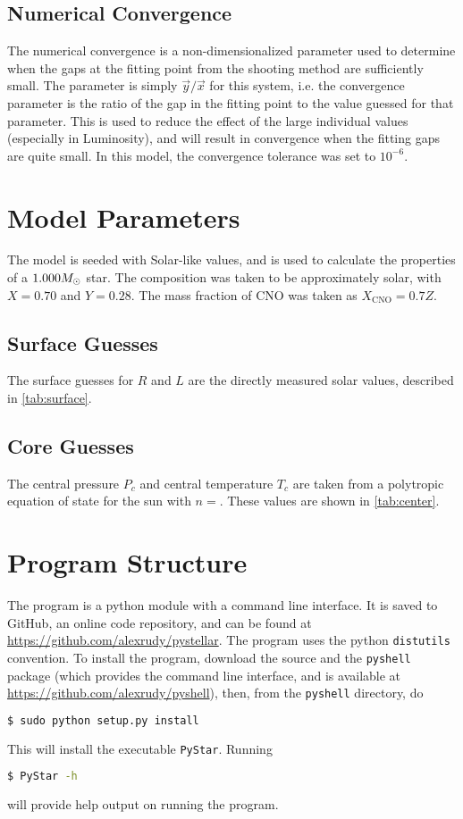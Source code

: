 \documentclass[12pt]{article}
\newcommand{\txt}{\textrm} %
\renewcommand{\v}[1]{\vec{#1}} %
\begin{document}
\subsection{Numerical Convergence} \label{sec:convergence}
The numerical convergence is a non-dimensionalized parameter used to determine when the gaps at the fitting point from the shooting method are sufficiently small. The parameter is simply $\v{y} / \v{x}$ for this system, i.e. the convergence parameter is the ratio of the gap in the fitting point to the value guessed for that parameter. This is used to reduce the effect of the large individual values (especially in Luminosity), and will result in convergence when the fitting gaps are quite small. In this model, the convergence tolerance was set to $10^{-6}$.
\section{Model Parameters}\label{sec:parameters}
The model is seeded with Solar-like values, and is used to calculate the properties of a $1.000 M_\odot$ star. The composition was taken to be approximately solar, with $X=0.70$ and $Y=0.28$. The mass fraction of CNO was taken as $X_\txt{CNO} = 0.7 Z$.

\subsection{Surface Guesses}
The surface guesses for $R$ and $L$ are the directly measured solar values, described in \cref{tab:surface}.

\subsection{Core Guesses}
The central pressure $P_c$ and central temperature $T_c$ are taken from a polytropic equation of state for the sun with $n=$. These values are shown in \cref{tab:center}.

\section{Program Structure} \label{sec:structure}
The program is a python module with a command line interface. It is saved to GitHub, an online code repository, and can be found at \url{https://github.com/alexrudy/pystellar}. The program uses the python \lstinline{distutils} convention. To install the program, download the source and the \lstinline{pyshell} package (which provides the command line interface, and is available at \url{https://github.com/alexrudy/pyshell}), then, from the \lstinline{pyshell} directory, do
\begin{lstlisting}[language=bash]
$ sudo python setup.py install
\end{lstlisting}
This will install the executable \lstinline{PyStar}. Running
\begin{lstlisting}[language=bash]
$ PyStar -h
\end{lstlisting}
will provide help output on running the program.
\end{document}
